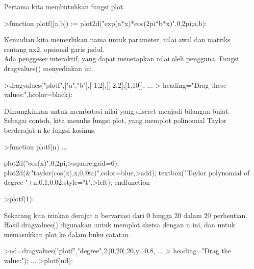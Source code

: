 \documentclass{article}
\begin{document}
\begin{eulernotebook}
\begin{eulercomment}
\begin{eulercomment}
\begin{eulercomment}
\begin{eulercomment}
\begin{eulercomment}
Pertama kita membutuhkan fungsi plot.
\end{eulercomment}
\begin{eulerprompt}
>function plotf([a,b]) := plot2d("exp(a*x)*cos(2pi*b*x)",0,2pi;a,b):
\end{eulerprompt}
\begin{eulercomment}
Kemudian kita memerlukan nama untuk parameter, nilai awal dan matriks
rentang nx2, opsional garis judul.\\
Ada penggeser interaktif, yang dapat menetapkan nilai oleh pengguna.
Fungsi dragvalues() menyediakan ini.
\end{eulercomment}
\begin{eulerprompt}
>dragvalues("plotf",["a","b"],[-1,2],[[-2,2];[1,10]], ...
>  heading="Drag these values:",hcolor=black):
\end{eulerprompt}
\begin{eulercomment}
Dimungkinkan untuk membatasi nilai yang diseret menjadi bilangan
bulat. Sebagai contoh, kita menulis fungsi plot, yang memplot
polinomial Taylor berderajat n ke fungsi kosinus.
\end{eulercomment}
\begin{eulerprompt}
>function plotf(n) ...
\end{eulerprompt}
\begin{eulerudf}
  plot2d("cos(x)",0,2pi,>square,grid=6);
  plot2d(&"taylor(cos(x),x,0,@n)",color=blue,>add);
  textbox("Taylor polynomial of degree "+n,0.1,0.02,style="t",>left);
  endfunction
\end{eulerudf}
\begin{eulerprompt}
>plotf(1):
\end{eulerprompt}
\begin{eulercomment}
Sekarang kita izinkan derajat n bervariasi dari 0 hingga 20 dalam 20
perhentian. Hasil dragvalues() digunakan untuk memplot sketsa dengan n
ini, dan untuk memasukkan plot ke dalam buku catatan.
\end{eulercomment}
\begin{eulerprompt}
>nd=dragvalues("plotf","degree",2,[0,20],20,y=0.8, ...
>   heading="Drag the value:"); ...
>plotf(nd):
\end{eulerprompt}
\begin{eulercomment}

\end{eulercomment}
\end{eulercomment}
\end{eulercomment}
\end{eulercomment}
\end{eulercomment}
\end{eulernotebook}
\end{document}
